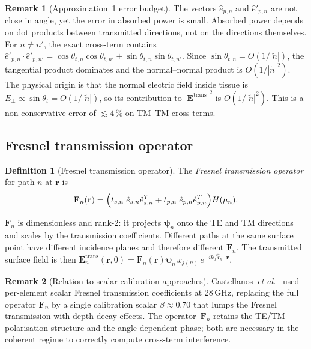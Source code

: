 \documentclass[11pt,a4paper]{article}
\theoremstyle{definition}      %
\newtheorem{definition}[definition]{Definition}
\newtheorem{remark}[remark]{Remark}
\begin{document}
\begin{remark}[Approximation~1 error budget]\label{rem:approx1-why}
The vectors $\hat{e}_{p,n}$ and $\hat{e}'_{p,n}$ are not close in
angle, yet the error in absorbed power is small.  Absorbed power
depends on dot products between transmitted directions, not on the
directions themselves.  For $n \neq n'$, the exact cross-term
contains $\hat{e}'_{p,n}\cdot\hat{e}'_{p,n'} =
\cos\theta_{t,n}\cos\theta_{t,n'} +
\sin\theta_{t,n}\sin\theta_{t,n'}$.  Since $\sin\theta_{t,n} =
O(1/|\tilde{n}|)$, the tangential product dominates and the
normal--normal product is $O(1/|\tilde{n}|^2)$.  The physical origin
is that the normal electric field inside tissue is $E_\perp \propto
\sin\theta_t = O(1/|\tilde{n}|)$, so its contribution to
$|\mathbf{E}^\mathrm{trans}|^2$ is $O(1/|\tilde{n}|^2)$.  This is a
non-conservative error of $\lesssim 4\,\%$ on TM--TM cross-terms.
\end{remark}

\subsection{Fresnel transmission operator}\label{sec:Fn-def}

\begin{definition}[Fresnel transmission operator]\label{def:fresnel-op}
The \emph{Fresnel transmission operator} for path $n$ at $\mathbf{r}$
is
\begin{equation}\label{eq:Fn}
  \mathbf{F}_n(\mathbf{r}) =
  \Bigl(
    t_{s,n}\;\hat{e}_{s,n}\hat{e}_{s,n}^T
    + t_{p,n}\;\hat{e}_{p,n}\hat{e}_{p,n}^T
  \Bigr)H(\mu_n).
\end{equation}
\end{definition}

$\mathbf{F}_n$ is dimensionless and rank-$2$: it projects
$\boldsymbol{\psi}_n$ onto the TE and TM directions and scales by
the transmission coefficients.  Different paths at the same surface
point have different incidence planes and therefore different
$\mathbf{F}_n$.  The transmitted surface field is then
$\mathbf{E}_n^\mathrm{trans}(\mathbf{r},0) = \mathbf{F}_n(\mathbf{r})
\boldsymbol{\psi}_n\,x_{j(n)}\,e^{-ik_0\hat{\mathbf{k}}_n\cdot\mathbf{r}}$.

\begin{remark}[Relation to scalar calibration approaches]
Castellanos~\textit{et al.}~\cite{Castellanos2020} used per-element scalar
Fresnel transmission coefficients at 28\,GHz, replacing the full
operator $\mathbf{F}_n$ by a single calibration scalar $\beta\approx 0.70$
that lumps the Fresnel transmission with depth-decay effects.
The operator~$\mathbf{F}_n$ retains the TE/TM polarisation structure and the
angle-dependent phase; both are necessary in the coherent regime to correctly
compute cross-term interference.
\end{remark}
\end{document}
